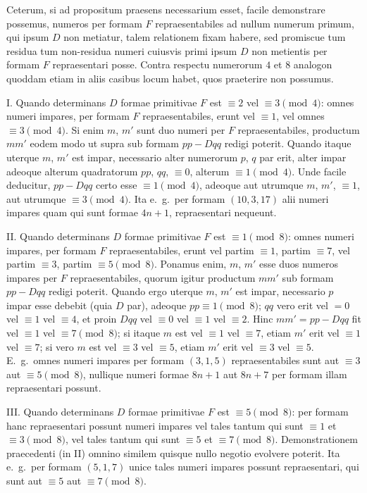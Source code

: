 \documentclass[12pt,a4paper]{article}
\theoremstyle{plain}
\theoremstyle{definition}
\theoremstyle{remark}
\begin{document}
Ceterum, si ad propositum praesens necessarium esset, facile demonstrare possemus, numeros per formam $F$ repraesentabiles ad nullum numerum primum, qui ipsum $D$ non metiatur, talem relationem fixam habere, sed promiscue tum residua tum non-residua numeri cuiusvis primi ipsum $D$ non metientis per formam $F$ repraesentari posse. Contra respectu numerorum $4$ et $8$ analogon quoddam etiam in aliis casibus locum habet, quos praeterire non possumus.

I. Quando determinans $D$ formae primitivae $F$ est $\equiv 2$ vel $\equiv 3\pmod{4}$: omnes numeri impares, per formam $F$ repraesentabiles, erunt vel $\equiv 1$, vel omnes $\equiv 3\pmod{4}$. Si enim $m$, $m'$ sunt duo numeri per $F$ repraesentabiles, productum $mm'$ eodem modo ut supra sub formam $pp-Dqq$ redigi poterit. Quando itaque uterque $m$, $m'$ est impar, necessario alter numerorum $p$, $q$ par erit, alter impar adeoque alterum quadratorum $pp$, $qq$, $\equiv 0$, alterum $\equiv 1\pmod{4}$. Unde facile deducitur, $pp-Dqq$ certo esse $\equiv 1\pmod{4}$, adeoque aut utrumque $m$, $m'$, $\equiv 1$, aut utrumque $\equiv 3\pmod{4}$. Ita e.\ g.\ per formam $(10,3,17)$ alii numeri impares quam qui sunt formae $4n+1$, repraesentari nequeunt.

II. Quando determinans $D$ formae primitivae $F$ est $\equiv 1\pmod{8}$: omnes numeri impares, per formam $F$ repraesentabiles, erunt vel partim $\equiv 1$, partim $\equiv 7$, vel partim $\equiv 3$, partim $\equiv 5\pmod{8}$. Ponamus enim, $m$, $m'$ esse duos numeros impares per $F$ repraesentabiles, quorum igitur productum $mm'$ sub formam $pp-Dqq$ redigi poterit. Quando ergo uterque $m$, $m'$ est impar, necessario $p$ impar esse debebit (quia $D$ par), adeoque $pp\equiv 1\pmod{8}$; $qq$ vero erit vel $=0$ vel $\equiv 1$ vel $\equiv 4$, et proin $Dqq$ vel $\equiv 0$ vel $\equiv 1$ vel $\equiv 2$. Hinc $mm'=pp-Dqq$ fit vel $\equiv 1$ vel $\equiv 7\pmod{8}$; si itaque $m$ est vel $\equiv 1$ vel $\equiv 7$, etiam $m'$ erit vel $\equiv 1$ vel $\equiv 7$; si vero $m$ est vel $\equiv 3$ vel $\equiv 5$, etiam $m'$ erit vel $\equiv 3$ vel $\equiv 5$. E.\ g.\ omnes numeri impares per formam $(3,1,5)$ repraesentabiles sunt aut $\equiv 3$ aut $\equiv 5\pmod{8}$, nullique numeri formae $8n+1$ aut $8n+7$ per formam illam repraesentari possunt.

III. Quando determinans $D$ formae primitivae $F$ est $\equiv 5\pmod{8}$: per formam hanc repraesentari possunt numeri impares vel tales tantum qui sunt $\equiv 1$ et $\equiv 3\pmod{8}$, vel tales tantum qui sunt $\equiv 5$ et $\equiv 7\pmod{8}$. Demonstrationem praecedenti (in II) omnino similem quisque nullo negotio evolvere poterit. Ita e.\ g.\ per formam $(5,1,7)$ unice tales numeri impares possunt repraesentari, qui sunt aut $\equiv 5$ aut $\equiv 7\pmod{8}$.
\end{document}
